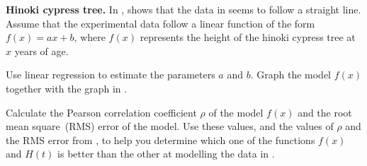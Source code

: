 \documentclass[a4paper,oneside,12pt]{article}
\begin{document}
\begin{exercise}
\textbf{Hinoki cypress tree.}
In ,
 shows that the data in
 seems to follow a straight line.
Assume that the experimental data follow a linear function of the form
$f(x) = ax + b$, where $f(x)$ represents the height of the hinoki
cypress tree at $x$ years of age.
\begin{packedenum}
\item\label{subex:logarithm:hinoki_linear_regression}
  Use linear regression to estimate the parameters $a$ and $b$.  Graph
  the model $f(x)$ together with the graph in
  .

\item\label{subex:logarithm:hinoki_Pearson_rho_RMS_error}
  Calculate the Pearson correlation coefficient $\rho$ of the model
  $f(x)$ and the root mean square~(RMS) error of the model.  Use these
  values, and the values of $\rho$ and the RMS error from
  , to help you determine
  which one of the functions $f(x)$ and $H(t)$ is better than the
  other at modelling the data in
  .
\end{packedenum}
\end{exercise}
\end{document}
